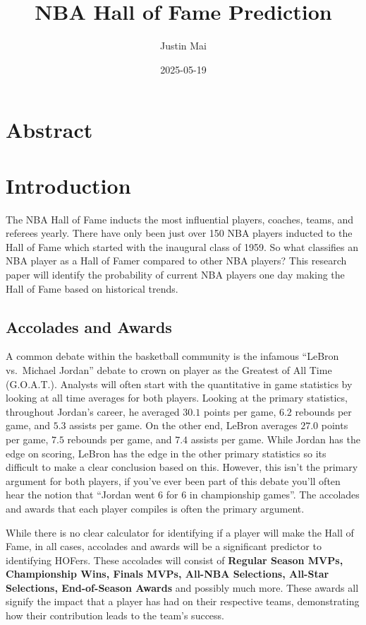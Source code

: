 \documentclass[
  11pt,
]{article}
\title{NBA Hall of Fame Prediction}
\author{Justin Mai}
\date{2025-05-19}
\begin{document}
\maketitle

{
\setcounter{tocdepth}{2}
\tableofcontents
}
\newpage

\section{Abstract}\label{abstract}

\newpage

\section{Introduction}\label{introduction}

The NBA Hall of Fame inducts the most influential players, coaches,
teams, and referees yearly. There have only been just over 150 NBA
players inducted to the Hall of Fame which started with the inaugural
class of 1959. So what classifies an NBA player as a Hall of Famer
compared to other NBA players? This research paper will identify the
probability of current NBA players one day making the Hall of Fame based
on historical trends.

\subsection{Accolades and Awards}\label{accolades-and-awards}

A common debate within the basketball community is the infamous ``LeBron
vs.~Michael Jordan'' debate to crown on player as the Greatest of All
Time (G.O.A.T.). Analysts will often start with the quantitative in game
statistics by looking at all time averages for both players. Looking at
the primary statistics, throughout Jordan's career, he averaged \(30.1\)
points per game, \(6.2\) rebounds per game, and \(5.3\) assists per
game. On the other end, LeBron averages \(27.0\) points per game,
\(7.5\) rebounds per game, and \(7.4\) assists per game. While Jordan
has the edge on scoring, LeBron has the edge in the other primary
statistics so its difficult to make a clear conclusion based on this.
However, this isn't the primary argument for both players, if you've
ever been part of this debate you'll often hear the notion that ``Jordan
went 6 for 6 in championship games''. The accolades and awards that each
player compiles is often the primary argument.

While there is no clear calculator for identifying if a player will make
the Hall of Fame, in all cases, accolades and awards will be a
significant predictor to identifying HOFers. These accolades will
consist of \textbf{Regular Season MVPs, Championship Wins, Finals MVPs,
All-NBA Selections, All-Star Selections, End-of-Season Awards} and
possibly much more. These awards all signify the impact that a player
has had on their respective teams, demonstrating how their contribution
leads to the team's success.
\end{document}
